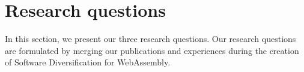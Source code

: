 












\section{Research questions}
\label{intro:definition:rq}

In this section, we present our three research questions. Our research questions are formulated by merging our publications and experiences during the creation of Software Diversification for WebAssembly. 

